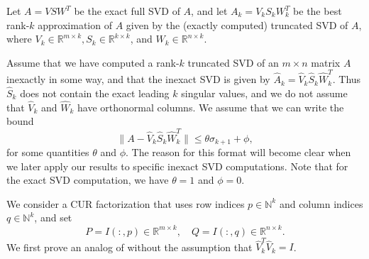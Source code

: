 \documentclass[12pt, a4paper]{article}
\newcommand{\What}{\widehat{W}}
\newcommand{\Shat}{\widehat{S}}
\newcommand{\Vhat}{\widehat{V}}
\newcommand{\E}{\theta}
\newcommand{\F}{\phi}
\def\norm#1{\|#1\|}
\theoremstyle{remark}
\begin{document}
\hspace{5mm}Let $A = V S W^T$ be the exact full SVD of $A$, and let $A_k = V_k S_k W_k^T$ be the best rank-$k$ approximation of $A$ given by the (exactly computed) truncated SVD of $A$, where $V_k \in \mathbb{R}^{m\times k}, S_k \in \mathbb{R}^{k \times k}$, and $W_k \in \mathbb{R}^{n \times k}$. 

Assume that we have computed a rank-$k$ truncated SVD of an $m\times n$ matrix $A$ inexactly in some way, and that the inexact SVD is given by $\widehat{A}_k = \Vhat_k \Shat_k \What_k^T$. Thus $\Shat_k$ does not contain the exact leading $k$ singular values, and we do not assume that $\Vhat_k$ and $\What_k$ have orthonormal columns. 
We assume that we can write the bound
 \begin{equation}
 \norm{A-\Vhat_k \Shat_k \What_k^T} \leq \E \sigma_{k+1} +\F,
 \label{eq:inexactSVD}
 \end{equation}
for some quantities $\E$ and $\F$. The reason for this format will become clear when we later apply our results to specific inexact SVD computations. Note that for the exact SVD computation, we have $\E=1$ and $\F=0$.


 We consider a CUR factorization that uses row indices $p\in\mathbb{N}^k$ and column indices $q\in\mathbb{N}^k$, and set
\begin{equation}
P=I(:,p)\in\mathbb{R}^{m\times k}, \quad Q=I(:,q)\in\mathbb{R}^{n\times k}.
\label{eq:PQdef}
\end{equation}
We first prove an analog of \cite[Lemma 4.1]{sorensen2016deim} without the assumption that $\Vhat_k^T \Vhat_k = I$. 
\end{document}
